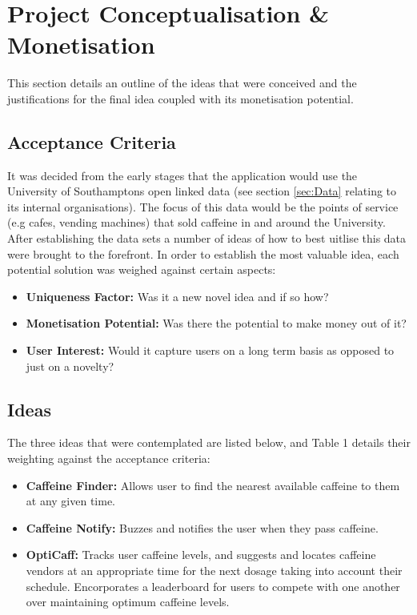 \section{Project Conceptualisation \& Monetisation}

This section details an outline of the ideas that were conceived and the justifications for the final idea coupled with its monetisation potential. 

\subsection{Acceptance Criteria}
It was decided from the early stages that the application would use the University of Southamptons open linked data (see section \ref{sec:Data} relating to its internal organisations). The focus of this data would be the points of service (e.g cafes, vending machines) that sold caffeine in and around the University. After establishing the data sets a number of ideas of how to best uitlise this data were brought to the forefront. In order to establish the most valuable idea, each potential solution was weighed against certain aspects: 

\begin{itemize}
	\item{\textbf{Uniqueness Factor:} Was it a new novel idea and if so how?}
	\item{\textbf{Monetisation Potential:} Was there the potential to make money out of it?}
	\item{\textbf{User Interest:} Would it capture users on a long term basis as opposed to just on a novelty?}
\end{itemize}

\subsection{Ideas}
The three ideas that were contemplated are listed below, and Table 1 details their weighting against the acceptance criteria:

\begin{itemize}
	\item{\textbf{Caffeine Finder:} Allows user to find the nearest available caffeine to them at any given time.}
	\item{\textbf{Caffeine Notify:} Buzzes and notifies the user when they pass caffeine.}
	\item{\textbf{OptiCaff:} Tracks user caffeine levels, and suggests and locates caffeine vendors at an appropriate time for the next dosage taking into account their schedule. Encorporates a leaderboard for users to compete with one another over maintaining optimum caffeine levels.}
\end{itemize}

